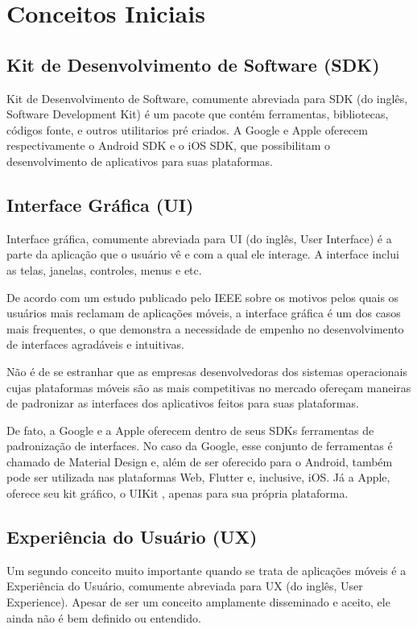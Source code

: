 \chapter{Conceitos Iniciais}

\section{Kit de Desenvolvimento de Software (SDK)}
Kit de Desenvolvimento de Software, comumente abreviada para SDK (do inglês, Software
Development Kit) é um pacote que contém ferramentas, bibliotecas, códigos fonte,
e outros utilitarios pré criados. \cite{Thorn2008}
A Google e Apple oferecem respectivamente o Android SDK e o iOS SDK, 
que possibilitam o desenvolvimento de aplicativos para suas plataformas.


\section{Interface Gr\'afica (UI)}
Interface gráfica, comumente abreviada para UI (do inglês, User Interface) é a 
parte da aplicação que o usuário vê e com a qual ele interage. \cite{Chong2004}
A interface inclui as telas, janelas, controles, menus e etc. \cite{Chong2004}

De acordo com um estudo publicado pelo IEEE \cite{Khalid2015} sobre os motivos pelos 
quais os usuários mais reclamam de aplicações móveis, a interface gráfica é um dos 
casos mais frequentes, o que demonstra a necessidade de empenho no desenvolvimento
de interfaces agradáveis e intuitivas.

Não é de se estranhar que as empresas desenvolvedoras dos sistemas operacionais
cujas plataformas móveis são as mais competitivas no mercado ofereçam maneiras de
padronizar as interfaces dos aplicativos feitos para suas plataformas.

De fato, a Google e a Apple oferecem dentro de seus SDKs ferramentas de padronização
de interfaces. No caso da Google, esse conjunto de ferramentas
é chamado de Material Design \cite{materialdesign} e, além de ser oferecido para o Android, também
pode ser utilizada nas plataformas Web, Flutter e, inclusive, iOS.
Já a Apple, oferece seu kit gráfico, o UIKit \cite{documentationapple}, apenas para sua própria plataforma.

\section{Experiência do Usu\'ario (UX)}
Um segundo conceito muito importante quando se trata de aplicações móveis
 é a Experiência do Usuário, comumente abreviada para UX (do inglês, User 
 Experience). Apesar de ser um conceito amplamente disseminado e aceito,
 ele ainda não é bem definido ou entendido. \cite{Law2008}
 
